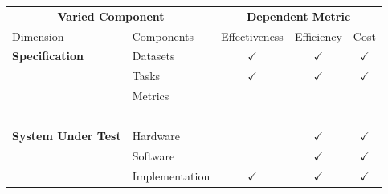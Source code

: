     
    \begin{table}[t]
        \begin{center}
        {\footnotesize
            \begin{tabular}{ll|ccc} 
                \multicolumn{2}{c}{\textbf{Varied Component}}                    & \multicolumn{3}{c}{\textbf{Dependent Metric}}           \\%
                Dimension                   &   Components              & Effectiveness       & Efficiency      &  Cost         \\%
                \hline
                \textbf{Specification}      &   Datasets                & $\checkmark$        & $\checkmark$    & $\checkmark$  \\%
                                            &   Tasks                   & $\checkmark$        & $\checkmark$    & $\checkmark$  \\%
                                            &   Metrics                 &                     &                 &               \\%
                            ~               &           ~               &         ~           &         ~       &       ~       \\%
                \textbf{System Under Test}  &   Hardware                &                     & $\checkmark$    & $\checkmark$  \\%
                                            &   Software                &                     & $\checkmark$    & $\checkmark$  \\%
                                            &   Implementation          & $\checkmark$        & $\checkmark$    & $\checkmark$  \\%

\end{tabular}}
\end{center}
\end{table}
